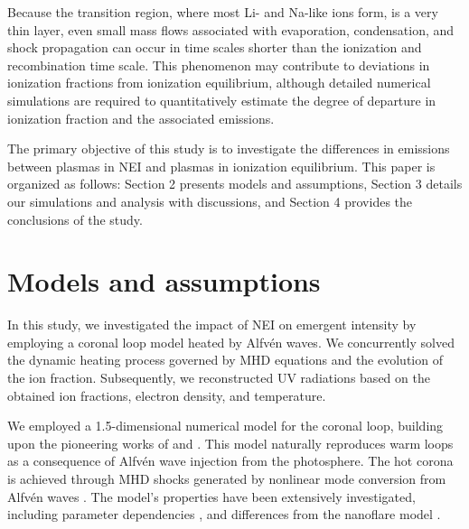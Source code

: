 \documentclass[fleqn,usenatbib]{mnras}
\begin{document}
Because the transition region, where most Li- and Na-like ions form, is a very thin layer, even small mass flows associated with evaporation, condensation, and shock propagation can occur in time scales shorter than the ionization and recombination time scale. This phenomenon may contribute to deviations in ionization fractions from ionization equilibrium, although detailed numerical simulations are required to quantitatively estimate the degree of departure in ionization fraction and the associated emissions.

The primary objective of this study is to investigate the differences in emissions between plasmas in NEI and plasmas in ionization equilibrium. This paper is organized as follows: Section 2 presents models and assumptions, Section 3 details our simulations and analysis with discussions, and Section 4 provides the conclusions of the study.


\section{Models and assumptions}
In this study, we investigated the impact of NEI on emergent intensity by employing a coronal loop model heated by Alfvén waves. We concurrently solved the dynamic heating process governed by MHD equations and the evolution of the ion fraction. Subsequently, we reconstructed UV radiations based on the obtained ion fractions, electron density, and temperature.

We employed a 1.5-dimensional numerical model for the coronal loop, building upon the pioneering works of \cite{2004ApJ...601L.107M} and \cite{2004ESASP.575...80M}. This model naturally reproduces warm loops as a consequence of Alfv\'{e}n wave injection from the photosphere. The hot corona is achieved through MHD shocks generated by nonlinear mode conversion from Alfv\'{e}n waves \citep{1982SoPh...75...35H, 1999ApJ...514..493K}. 
The model's properties have been extensively investigated, including parameter dependencies \citep{2010ApJ...712..494A, 2010ApJ...710.1857M}, and differences from the nanoflare model \citep{2008ApJ...688..669A}.
\end{document}
